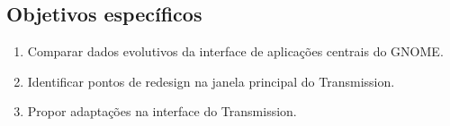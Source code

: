 \documentclass[
    12pt,               %
    openright,          %
    oneside,            %
    a4paper,            %
    chapter=TITLE,      %
    section=TITLE,      %
    english,
    brazil              %
]{abntex2}
\begin{document}
\subsection{Objetivos específicos}

\begin{enumerate}[label=(\alph*)]
  \item Comparar dados evolutivos da interface de aplicações centrais do GNOME.
  \item Identificar pontos de redesign na janela principal do Transmission.
  \item Propor adaptações na interface do Transmission.
\end{enumerate}











\label{nropaginas}

\printindex
\end{document}
